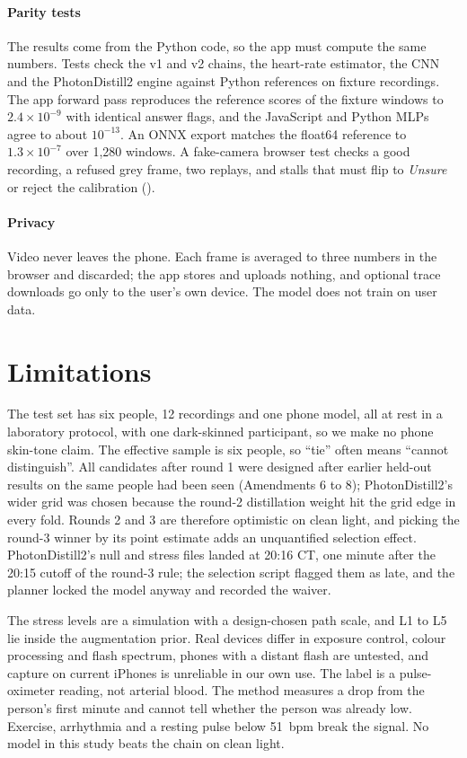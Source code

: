 \documentclass[11pt,letterpaper]{article}
\newcommand{\code}[1]{\texttt{\detokenize{#1}}}
\begin{document}
\paragraph{Parity tests} The results come from the Python code, so the app must compute the same numbers. Tests check the v1 and v2 chains, the heart-rate estimator, the CNN and the PhotonDistill2 engine against Python references on fixture recordings. The app forward pass reproduces the reference scores of the fixture windows to $2.4\times10^{-9}$ with identical answer flags, and the JavaScript and Python MLPs agree to about $10^{-13}$. An ONNX export matches the float64 reference to $1.3\times10^{-7}$ over 1,280 windows. A fake-camera browser test checks a good recording, a refused grey frame, two replays, and stalls that must flip to \emph{Unsure} or reject the calibration (\code{results/photon/EXPORT_CHECK.md}).

\paragraph{Privacy} Video never leaves the phone. Each frame is averaged to three numbers in the browser and discarded; the app stores and uploads nothing, and optional trace downloads go only to the user's own device. The model does not train on user data.

\section{Limitations}\label{sec:limits}
The test set has six people, 12 recordings and one phone model, all at rest in a laboratory protocol, with one dark-skinned participant, so we make no phone skin-tone claim. The effective sample is six people, so ``tie'' often means ``cannot distinguish''. All candidates after round 1 were designed after earlier held-out results on the same people had been seen (Amendments 6 to 8); PhotonDistill2's wider grid was chosen because the round-2 distillation weight hit the grid edge in every fold. Rounds 2 and 3 are therefore optimistic on clean light, and picking the round-3 winner by its point estimate adds an unquantified selection effect. PhotonDistill2's null and stress files landed at 20:16 CT, one minute after the 20:15 cutoff of the round-3 rule; the selection script flagged them as late, and the planner locked the model anyway and recorded the waiver.

The stress levels are a simulation with a design-chosen path scale, and L1 to L5 lie inside the augmentation prior. Real devices differ in exposure control, colour processing and flash spectrum, phones with a distant flash are untested, and capture on current iPhones is unreliable in our own use. The label is a pulse-oximeter reading, not arterial blood. The method measures a drop from the person's first minute and cannot tell whether the person was already low. Exercise, arrhythmia and a resting pulse below 51~bpm break the signal. No model in this study beats the chain on clean light.
\end{document}
